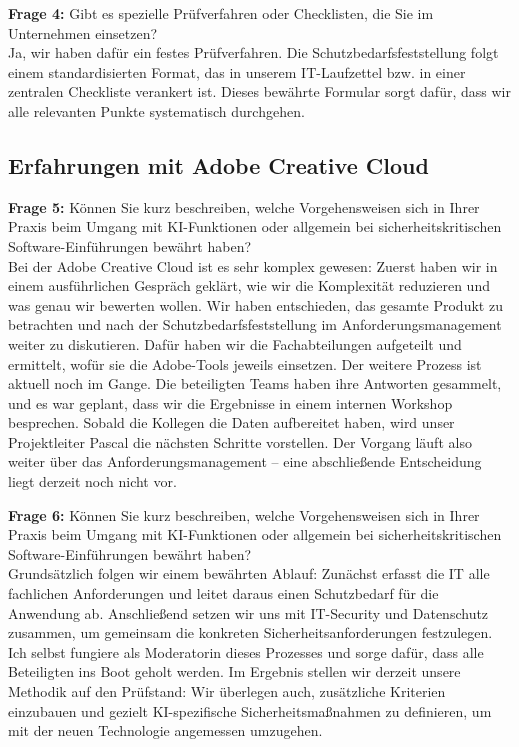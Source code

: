 \documentclass[
    12pt, 
    a4paper,
    ]{scrartcl} %
\begin{document}
\textbf{Frage 4:} Gibt es spezielle Prüfverfahren oder Checklisten, die Sie im Unternehmen einsetzen? \\[0.5em]
Ja, wir haben dafür ein festes Prüfverfahren. Die Schutzbedarfsfeststellung folgt einem standardisierten Format, das in unserem IT-Laufzettel bzw. in einer zentralen Checkliste verankert ist. Dieses bewährte Formular sorgt dafür, dass wir alle relevanten Punkte systematisch durchgehen.

\subsection*{Erfahrungen mit Adobe Creative Cloud}

\textbf{Frage 5:} Können Sie kurz beschreiben, welche Vorgehensweisen sich in Ihrer Praxis beim Umgang mit KI-Funktionen oder allgemein bei sicherheitskritischen Software-Einführungen bewährt haben? \\[0.5em]
Bei der Adobe Creative Cloud ist es sehr komplex gewesen: Zuerst haben wir in einem ausführlichen Gespräch geklärt, wie wir die Komplexität reduzieren und was genau wir bewerten wollen. Wir haben entschieden, das gesamte Produkt zu betrachten und nach der Schutzbedarfsfeststellung im Anforderungsmanagement weiter zu diskutieren. Dafür haben wir die Fachabteilungen aufgeteilt und ermittelt, wofür sie die Adobe-Tools jeweils einsetzen. Der weitere Prozess ist aktuell noch im Gange. Die beteiligten Teams haben ihre Antworten gesammelt, und es war geplant, dass wir die Ergebnisse in einem internen Workshop besprechen. Sobald die Kollegen die Daten aufbereitet haben, wird unser Projektleiter Pascal die nächsten Schritte vorstellen. Der Vorgang läuft also weiter über das Anforderungsmanagement – eine abschließende Entscheidung liegt derzeit noch nicht vor.

\textbf{Frage 6:} Können Sie kurz beschreiben, welche Vorgehensweisen sich in Ihrer Praxis beim Umgang mit KI-Funktionen oder allgemein bei sicherheitskritischen Software-Einführungen bewährt haben? \\[0.5em]
Grundsätzlich folgen wir einem bewährten Ablauf: Zunächst erfasst die IT alle fachlichen Anforderungen und leitet daraus einen Schutzbedarf für die Anwendung ab. Anschließend setzen wir uns mit IT-Security und Datenschutz zusammen, um gemeinsam die konkreten Sicherheitsanforderungen festzulegen. Ich selbst fungiere als Moderatorin dieses Prozesses und sorge dafür, dass alle Beteiligten ins Boot geholt werden. Im Ergebnis stellen wir derzeit unsere Methodik auf den Prüfstand: Wir überlegen auch, zusätzliche Kriterien einzubauen und gezielt KI-spezifische Sicherheitsmaßnahmen zu definieren, um mit der neuen Technologie angemessen umzugehen.
\end{document}

